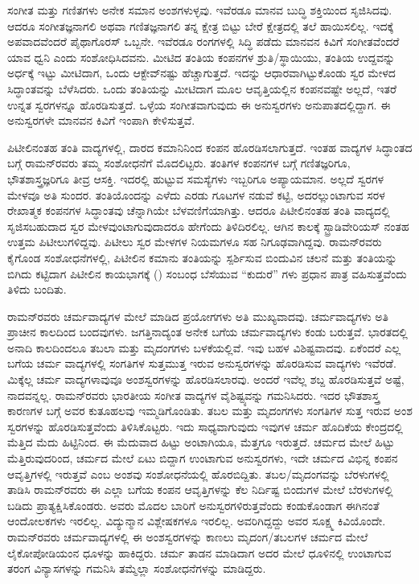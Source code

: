 ಸಂಗೀತ ಮತ್ತು ಗಣಿತಗಳು ಅನೇಕ ಸಮಾನ ಅಂಶಗಳುಳ್ಳವು. ಇವೆರಡೂ ಮಾನವ ಬುದ್ಧಿ ಶಕ್ತಿಯಿಂದ ಸೃಜಿಸಿದವು. ಆದರೂ ಸಂಗೀತಜ್ಞನಾಗಲಿ ಅಥವಾ ಗಣಿತಜ್ಞನಾಗಲಿ ತನ್ನ ಕ್ಷೇತ್ರ ಬಿಟ್ಟು ಬೇರೆ ಕ್ಷೇತ್ರದಲ್ಲಿ ತಲೆ ಹಾಯಿಸಲಿಲ್ಲ. ಇದಕ್ಕೆ ಅಪವಾದವೆಂದರೆ ಪೈಥಾಗೊರಸ್ ಒಬ್ಬನೇ. ಇವೆರಡೂ ರಂಗಗಳಲ್ಲಿ ಸಿದ್ಧಿ ಪಡೆದು ಮಾನವನ ಕಿವಿಗೆ ಸಂಗೀತವೆಂದರೆ ಯಾವ ಧ್ವನಿ ಎಂದು ಸಂಶೋಧಿಸಿದವನು. ಮೀಟಿದ ತಂತಿಯ ಕಂಪನಗಳ ಶ್ರುತಿ/ಸ್ಥಾಯಿಯು, ತಂತಿಯ ಉದ್ದವನ್ನು ಅರ್ಧಕ್ಕೆ ಇಟ್ಟು ಮೀಟಿದಾಗ, ಒಂದು ಆಕ್ಟೇವ್‍ನಷ್ಟು ಹೆಚ್ಚಾಗುತ್ತದೆ. ಇದನ್ನು ಆಧಾರವಾಗಿಟ್ಟುಕೊಂಡು ಸ್ವರ ಮೇಳದ ಸಿದ್ಧಾಂತವನ್ನು ಬೆಳೆಸಿದರು. ಒಂದು ತಂತಿಯನ್ನು ಮೀಟಿದಾಗ ಮೂಲ ಆವೃತ್ತಿಯಲ್ಲಿನ ಕಂಪನವಷ್ಟೇ ಅಲ್ಲದೆ, ಇತರೆ ಉನ್ನತ ಸ್ವರಗಳನ್ನೂ ಹೊರಡಿಸುತ್ತದೆ. ಒಳ್ಳೆಯ ಸಂಗೀತವಾಗುವುದು ಈ ಅನುಸ್ವರಗಳು  ಅನುಪಾತದಲ್ಲಿದ್ದಾಗ. ಈ ಅನುಸ್ವರಗಳೇ ಮಾನವನ ಕಿವಿಗೆ ಇಂಪಾಗಿ ಕೇಳಿಸುತ್ತವೆ.

ಪಿಟೀಲಿನಂತಹ ತಂತಿ ವಾದ್ಯಗಳಲ್ಲಿ, ದಾರದ ಕಮಾನಿನಿಂದ ಕಂಪನ ಹೊರಡಿಸಲಾಗುತ್ತದೆ. ಇಂತಹ ವಾದ್ಯಗಳ ಸಿದ್ಧಾಂತದ ಬಗ್ಗೆ ರಾಮನ್‍ರವರು ತಮ್ಮ ಸಂಶೋಧನೆಗೆ ಮೊದಲಿಟ್ಟರು. ತಂತಿಗಳ ಕಂಪನಗಳ ಬಗ್ಗೆ ಗಣಿತಜ್ಞರಿಗೂ, ಭೌತಶಾಸ್ತ್ರಜ್ಞರಿಗೂ ತೀವ್ರ ಆಸಕ್ತಿ. ಇದರಲ್ಲಿ ಹುಟ್ಟುವ ಸಮಸ್ಯೆಗಳು ಇಬ್ಬರಿಗೂ ಅಪ್ಯಾಯಮಾನ. ಅಲ್ಲದೆ ಸ್ವರಗಳ ಮೇಳವೂ ಅತಿ ಸುಂದರ. ತಂತಿಯೊಂದನ್ನು ಎಳೆದು ಎರಡು ಗೂಟಗಳ ನಡುವೆ ಕಟ್ಟಿ, ಅದರಲ್ಲುಂಟಾಗುವ ಸರಳ ರೇಖಾತ್ಮಕ ಕಂಪನಗಳ ಸಿದ್ಧಾಂತವು ಚೆನ್ನಾಗಿಯೇ ಬೆಳವಣಿಗೆಯಾಗಿತ್ತು. ಆದರೂ ಪಿಟೀಲಿನಂತಹ ತಂತಿ ವಾದ್ಯದಲ್ಲಿ ಸೃಜಿಸಬಹುದಾದ ಸ್ವರ ಮೇಳವುಂಟಾಗುವುದಾದರೂ ಹೇಗೆಂದು ತಿಳಿದಿರಲಿಲ್ಲ. ಆಗಿನ ಕಾಲಕ್ಕೆ ಸ್ಟ್ರಾಡಿವೇರಿಯಸ್ ನಂತಹ ಉತ್ತಮ ಪಿಟೀಲುಗಳಿದ್ದವು. ಪಿಟೀಲು ಸ್ವರ ಮೇಳಗಳ ನಿಯಮಗಳೂ ಸಹ ನಿಗೂಢವಾಗಿದ್ದವು. ರಾಮನ್‍ರವರು ಕೈಗೊಂಡ ಸಂಶೋಧನೆಗಳಲ್ಲಿ, ಪಿಟೀಲಿನ ಕಮಾನು ತಂತಿಯನ್ನು ಸ್ಪರ್ಶಿಸುವ ಬಿಂದುವಿನ ಚಲನೆ ಮತ್ತು ತಂತಿಯನ್ನು ಬಿಗಿದು ಕಟ್ಟಿದಾಗ ಪಿಟೀಲಿನ ಕಾಯಭಾಗಕ್ಕೆ () ಸಂಬಂಧ ಬೆಸೆಯುವ “ಕುದುರೆ” ಗಳು ಪ್ರಧಾನ ಪಾತ್ರ ವಹಿಸುತ್ತವೆಂದು ತಿಳಿದು ಬಂದಿತು.

ರಾಮನ್‍ರವರು ಚರ್ಮವಾದ್ಯಗಳ ಮೇಲೆ ಮಾಡಿದ ಪ್ರಯೋಗಗಳು ಅತಿ ಮುಖ್ಯವಾದವು. ಚರ್ಮವಾದ್ಯಗಳು ಅತಿ ಪ್ರಾಚೀನ ಕಾಲದಿಂದ ಬಂದವುಗಳು. ಜಗತ್ತಿನಾದ್ಯಂತ ಅನೇಕ ಬಗೆಯ ಚರ್ಮವಾದ್ಯಗಳು ಕಂಡು ಬರುತ್ತವೆ. ಭಾರತದಲ್ಲಿ ಅನಾದಿ ಕಾಲದಿಂದಲೂ ತಬಲಾ ಮತ್ತು ಮೃದಂಗಗಳು ಬಳಕೆಯಲ್ಲಿವೆ. ಇವು ಬಹಳ ವಿಶಿಷ್ಟವಾದವು. ಏಕೆಂದರೆ ಎಲ್ಲ ಬಗೆಯ ಚರ್ಮ ವಾದ್ಯಗಳಲ್ಲಿ ಸಂಗತಿಗಳ ಸುತ್ತಮುತ್ತ ಇರುವ ಅನುಸ್ವರಗಳನ್ನು ಹೊರಡಿಸುವ ವಾದ್ಯಗಳು ಇವೆರಡೆ. ಮಿಕ್ಕೆಲ್ಲ ಚರ್ಮ ವಾದ್ಯಗಳಾವುವೂ ಅಂಶಸ್ವರಗಳನ್ನು ಹೊರಡಿಸಲಾರವು. ಅಂದರೆ ಇವೆಲ್ಲ ಶಬ್ದ ಹೊರಡಿಸುತ್ತವೆ ಅಷ್ಟೆ, ನಾದವನ್ನಲ್ಲ. ರಾಮನ್‍ರವರು ಭಾರತೀಯ ಸಂಗೀತ ವಾದ್ಯಗಳ ವೈಶಿಷ್ಟ್ಯವನ್ನು ಗಮನಿಸಿದರು. ಇದರ ಭೌತಶಾಸ್ತ್ರ ಕಾರಣಗಳ ಬಗ್ಗೆ ಅವರ ಕುತೂಹಲವು ಇಮ್ಮಡಿಗೊಂಡಿತು. ತಬಲ ಮತ್ತು ಮೃದಂಗಗಳು ಸಂಗತಿಗಳ ಸುತ್ತ ಇರುವ ಅಂಶ ಸ್ವರಗಳನ್ನು ಹೊರಡಿಸುತ್ತವೆಂದು ತಿಳಿಸಿಕೊಟ್ಟರು. ಇದು ಸಾಧ್ಯವಾಗುವುದು ಇವುಗಳ ಚರ್ಮ ಹೊದಿಕೆಯ ಕೇಂದ್ರದಲ್ಲಿ ಮೆತ್ತಿದ ಮೆದು ಹಿಟ್ಟಿನಿಂದ. ಈ ಮೆದುವಾದ ಹಿಟ್ಟು ಅಂಟಾಗಿಯೂ, ಮೆತ್ತಗೂ ಇರುತ್ತದೆ. ಚರ್ಮದ ಮೇಲೆ ಹಿಟ್ಟು ಮೆತ್ತಿರುವುದರಿಂದ, ಚರ್ಮದ ಮೇಲೆ ಏಟು ಬಿದ್ದಾಗ ಉಂಟಾಗುವ ಅನುಸ್ವರಗಳು, ಇದೇ ಚರ್ಮದ ವಿಭಿನ್ನ ಕಂಪನ ಆವೃತ್ತಿಗಳಲ್ಲಿ ಇರುತ್ತವೆ ಎಂಬ ಅಂಶವು ಸಂಶೋಧನೆಯಲ್ಲಿ ಹೊರಬಿದ್ದಿತು. ತಬಲ/ಮೃದಂಗವನ್ನು ಬೆರಳುಗಳಲ್ಲಿ ತಾಡಿಸಿ ರಾಮನ್‍ರವರು ಈ ಎಲ್ಲಾ ಬಗೆಯ ಕಂಪನ ಆವೃತ್ತಿಗಳನ್ನು ಕೆಲ ನಿರ್ದಿಷ್ಟ ಬಿಂದುಗಳ ಮೇಲೆ ಬೆರಳುಗಳಲ್ಲಿ ಬಡಿದು ಪ್ರಾತ್ಯಕ್ಷಿಸಿಕೊಂಡರು. ಅವರು ಮೊದಲ ಬಾರಿಗೆ ಅನುಸ್ವರಗಳಿರುತ್ತವೆಂದು ಕಂಡುಕೊಂಡಾಗ ಈಗಿನಂತೆ ಆಂದೋಲಕಗಳು ಇರಲಿಲ್ಲ. ವಿದ್ಯುನ್ಮಾನ ವಿಶ್ಲೇಷಕಗಳೂ ಇರಲಿಲ್ಲ. ಅವರಿಗಿದ್ದದ್ದು ಅವರ ಸೂಕ್ಷ್ಮ ಕಿವಿಯೊಂದೇ. ರಾಮನ್‍ರವರು ಚರ್ಮವಾದ್ಯಗಳಲ್ಲಿ ಈ ಅಂಶಸ್ವರಗಳನ್ನು ಕಾಣಲು ಮೃದಂಗ/ತಬಲಗಳ ಚರ್ಮದ ಮೇಲೆ ಲೈಕೋಪೋಡಿಯಂನ ಧೂಳನ್ನು ಹಾಕಿದ್ದರು. ಚರ್ಮ ತಾಡನ ಮಾಡಿದಾಗ ಅದರ ಮೇಲೆ ಧೂಳಿನಲ್ಲಿ ಉಂಟಾಗುವ ತರಂಗ ವಿನ್ಯಾಸಗಳನ್ನು ಗಮನಿಸಿ ತಮ್ಮೆಲ್ಲಾ ಸಂಶೋಧನೆಗಳನ್ನು ಮಾಡಿದ್ದರು.

